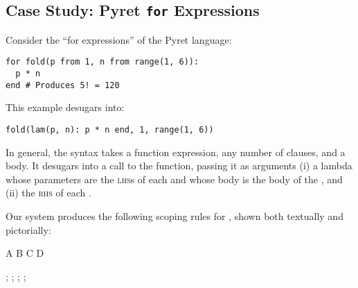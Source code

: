\subsection{Case Study: Pyret \texttt{for} Expressions}
\label{sec:rscope-for-example}
Consider the ``for expressions'' of the Pyret language:
\begin{verbatim}
for fold(p from 1, n from range(1, 6)):
  p * n
end # Produces 5! = 120
\end{verbatim}
  This example desugars into:
\begin{verbatim}
fold(lam(p, n): p * n end, 1, range(1, 6))
\end{verbatim}
  In general, the  syntax takes a function
  expression, any number of  clauses, and a body. It desugars
  into a call to the function, passing it as arguments (i) a lambda whose
  parameters are the \textsc{lhs}s of each  and whose body
  is the body of the , and (ii) the
  \textsc{rhs} of each .

  Our system produces the following scoping rules for ,
  shown both textually and pictorially:

\begin{scopeDescription}
\begin{center}
\begin{tikzScopeDiagram}
  \tikzRoot
    {A}{
      {B}{}
      {C}{}
      {D}{}}
      
  \begin{tikzEdges}
    ;
    ;
    ;
    ;
  \end{tikzEdges}
\end{tikzScopeDiagram}
\end{center}
\begin{ScopeRules}
   \\
   \\
   \\
\end{ScopeRules}
\end{scopeDescription}

